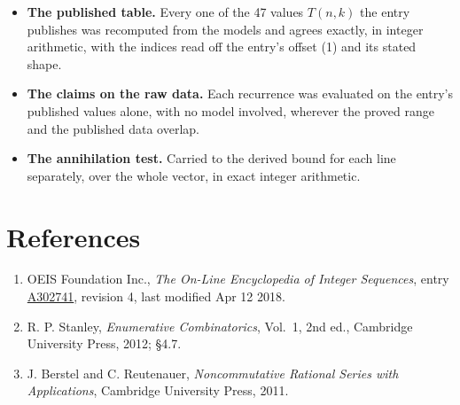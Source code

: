 \documentclass[11pt]{article}
\theoremstyle{definition}
\begin{document}
\begin{itemize}

\item {\bfseries The published table.} Every one of the 47 values $T(n,k)$ the entry publishes was recomputed from the models and agrees exactly, in integer arithmetic, with the indices read off the entry's offset (1) and its stated shape.

\item {\bfseries The claims on the raw data.} Each recurrence was evaluated on the entry's published values alone, with no model involved, wherever the proved range and the published data overlap.

\item {\bfseries The annihilation test.} Carried to the derived bound for each line separately, over the whole vector, in exact integer arithmetic.

\end{itemize}

\section{References}

\begin{enumerate}

\item OEIS Foundation Inc., \emph{The On-Line Encyclopedia of Integer Sequences}, entry \href{https://oeis.org/A302741}{A302741}, revision 4, last modified Apr 12 2018.

\item R. P. Stanley, \emph{Enumerative Combinatorics}, Vol.~1, 2nd ed., Cambridge University Press, 2012; \S4.7.

\item J. Berstel and C. Reutenauer, \emph{Noncommutative Rational Series with Applications}, Cambridge University Press, 2011.

\end{enumerate}
\end{document}
